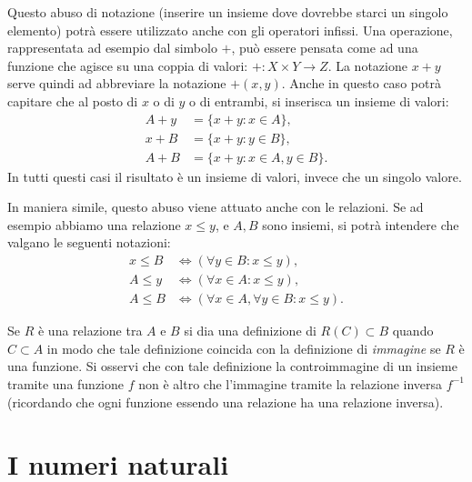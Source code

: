 \documentclass[italian,a4paper,hidelinks,headinclude]{scrartcl}
\begin{document}
Questo abuso di notazione
(inserire un insieme dove dovrebbe starci un singolo elemento)
potrà essere utilizzato anche con gli operatori infissi.
Una operazione, rappresentata ad esempio dal simbolo $+$, può essere pensata
come ad una funzione che agisce su una coppia di valori: $+\colon X\times Y \to Z$.
La notazione $x+y$ serve quindi ad abbreviare la notazione $+(x,y)$.
Anche in questo caso potrà capitare che al posto di $x$ o di $y$ o di entrambi,
si inserisca un insieme di valori:
\begin{align*}
   A + y &= \{x+y\colon x \in A\}, \\
   x + B &= \{x+y\colon y \in B\}, \\
   A + B &= \{x+y\colon x\in A, y \in B\}.
\end{align*}
In tutti questi casi il risultato è un insieme di valori, invece che un singolo
valore.

In maniera simile, questo abuso viene attuato anche con le relazioni.
Se ad esempio abbiamo
una relazione $x\le y$, e $A, B$ sono insiemi, si potrà intendere
che valgano le seguenti notazioni:
\begin{align*}
  x \le B &\iff (\forall y\in B\colon x\le y), \\
  A \le y &\iff (\forall x\in A\colon x \le y), \\
  A \le B &\iff (\forall x\in A, \forall y\in B\colon x\le y).
\end{align*}

\begin{exercise}
Se $R$ è una relazione tra $A$ e $B$ si dia una definizione di $R(C)\subset B$
quando $C\subset A$ in modo che tale definizione coincida con la definizione
di \emph{immagine} se $R$ è una funzione.
Si osservi che con tale definizione la controimmagine di un insieme tramite
una funzione $f$ non è altro che l'immagine tramite la relazione inversa $f^{-1}$
(ricordando che ogni funzione essendo una relazione ha una relazione inversa).
\end{exercise}

\section{I numeri naturali}
\end{document}
